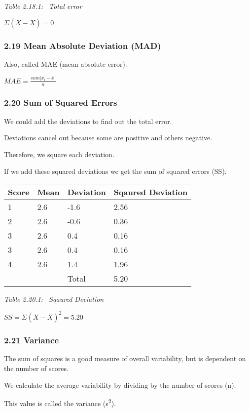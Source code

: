 \documentclass[]{article}
\begin{document}
\emph{Table 2.18.1: ~Total error}

\(\Sigma(X - \bar{X}) = 0\)

\hypertarget{mean-absolute-deviation-mad}{%
\subsubsection{2.19 Mean Absolute Deviation
(MAD)}\label{mean-absolute-deviation-mad}}

Also, called MAE (mean absolute error).

\(MAE = \frac{sum|x_i - \bar{x}|}{n}\)

\hypertarget{sum-of-squared-errors}{%
\subsubsection{2.20 Sum of Squared Errors}\label{sum-of-squared-errors}}

We could add the deviations to find out the total error.

Deviations cancel out because some are positive and others negative.

Therefore, we square each deviation.

If we add these squared deviations we get the sum of squared errors
(SS).

\begin{longtable}[]{@{}llll@{}}
\toprule
Score & Mean & Deviation & Sqaured Deviation\tabularnewline
\midrule
\endhead
1 & 2.6 & -1.6 & 2.56\tabularnewline
2 & 2.6 & -0.6 & 0.36\tabularnewline
3 & 2.6 & 0.4 & 0.16\tabularnewline
3 & 2.6 & 0.4 & 0.16\tabularnewline
4 & 2.6 & 1.4 & 1.96\tabularnewline
& & Total & 5.20\tabularnewline
\bottomrule
\end{longtable}

\emph{Table 2.20.1: ~Sqaured Deviation}

\(SS = \Sigma(X - \bar{X})^2 = 5.20\)

\hypertarget{variance}{%
\subsubsection{2.21 Variance}\label{variance}}

The sum of squares is a good measure of overall variability, but is
dependent on the number of scores.

We calculate the average variability by dividing by the number of scores
(n).

This value is called the variance (s\textsuperscript{2}).
\end{document}
